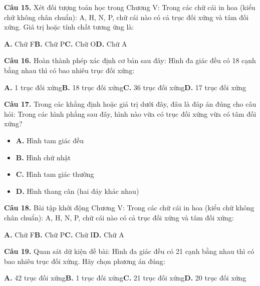 \documentclass[11pt,a4paper]{article}
\begin{document}
\textbf{\color{primary} Câu 15.} Xét đối tượng toán học trong Chương V: Trong các chữ cái in hoa (kiểu chữ không chân chuẩn): A, H, N, P, chữ cái nào có cả trục đối xứng và tâm đối xứng. Giá trị hoặc tính chất tương ứng là:\par
\hspace*{1.5em}\textbf{A.} Chữ F\quad\quad \textbf{B.} Chữ P\quad\quad \textbf{C.} Chữ O\quad\quad \textbf{D.} Chữ A\par\vspace{2pt}
\textbf{\color{primary} Câu 16.} Hoàn thành phép xác định cơ bản sau đây: Hình đa giác đều có 18 cạnh bằng nhau thì có bao nhiêu trục đối xứng:\par
\hspace*{1.5em}\textbf{A.} 1 trục đối xứng\quad\quad \textbf{B.} 18 trục đối xứng\quad\quad \textbf{C.} 36 trục đối xứng\quad\quad \textbf{D.} 17 trục đối xứng\par\vspace{2pt}
\textbf{\color{primary} Câu 17.} Trong các khẳng định hoặc giá trị dưới đây, đâu là đáp án đúng cho câu hỏi: Trong các hình phẳng sau đây, hình nào vừa có trục đối xứng vừa có tâm đối xứng?\par
\begin{itemize}\setlength{\itemsep}{1pt}\setlength{\parskip}{0pt}
  \item[] \textbf{A.} Hình tam giác đều
  \item[] \textbf{B.} Hình chữ nhật
  \item[] \textbf{C.} Hình tam giác thường
  \item[] \textbf{D.} Hình thang cân (hai đáy khác nhau)
\end{itemize}\vspace{2pt}
\textbf{\color{primary} Câu 18.} Bài tập khởi động Chương V: Trong các chữ cái in hoa (kiểu chữ không chân chuẩn): A, H, N, P, chữ cái nào có cả trục đối xứng và tâm đối xứng:\par
\hspace*{1.5em}\textbf{A.} Chữ F\quad\quad \textbf{B.} Chữ P\quad\quad \textbf{C.} Chữ I\quad\quad \textbf{D.} Chữ A\par\vspace{2pt}
\textbf{\color{primary} Câu 19.} Quan sát dữ kiện đề bài: Hình đa giác đều có 21 cạnh bằng nhau thì có bao nhiêu trục đối xứng. Hãy chọn phương án đúng:\par
\hspace*{1.5em}\textbf{A.} 42 trục đối xứng\quad\quad \textbf{B.} 1 trục đối xứng\quad\quad \textbf{C.} 21 trục đối xứng\quad\quad \textbf{D.} 20 trục đối xứng\par\vspace{2pt}
\end{document}
